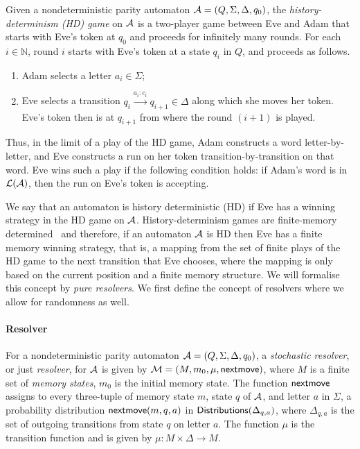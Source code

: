 \begin{definition}\label{defn:hd-game}
Given a nondeterministic parity automaton $\mathcal{A} = (Q,\Sigma, \Delta, q_0)$, the \emph{history-determinism (HD) game} on $\mathcal{A}$ is a two-player game between Eve and Adam that starts with Eve's token at $q_0$ and proceeds for infinitely many rounds. 
For each $i \in \mathbb{N}$, round $i$ starts with Eve's token at a state $q_i$ in $Q$, and proceeds as follows.
\begin{enumerate}
    \item Adam selects a letter $a_i \in \Sigma$;
    \item Eve selects a transition $q_i \xrightarrow{a_i:c_i} q_{i+1} \in \Delta$ along which she moves her token. Eve's token then is at $q_{i+1}$ from where the round $(i+1)$ is played. 
\end{enumerate} 
Thus, in the limit of a play of the HD game, Adam constructs a word letter-by-letter, and Eve constructs a run on her token transition-by-transition on that word. Eve wins such a play if the following condition holds: if Adam's word  is in $\mathcal{L}(\mathcal{A})$, then the run on Eve's token is accepting.
\end{definition}
We say that an automaton is history deterministic (HD) if Eve has a winning strategy in the HD game on $\mathcal{A}$. History-determinism games are finite-memory determined~\cite[Theorem 3.12]{Pra25} and therefore, if an automaton $\mathcal{A}$ is HD then Eve has a finite memory winning strategy, that is, a mapping from the set of finite plays of the HD game to the next transition that Eve chooses, where the mapping is only based on the current position and a finite memory structure. We will formalise this concept by \emph{pure resolvers}. We first define the concept of resolvers where we allow for randomness as well.     

\paragraph*{Resolver}
For a nondeterministic parity automaton $\mathcal{A}=(Q,\Sigma,\Delta,q_0)$, a \emph{stochastic resolver}, or just \emph{resolver}, for $\mathcal{A}$ is given by $\mathcal{M}=(M,m_0,\mu,{\mathsf{nextmove}})$, where $M$ is a finite set of \emph{memory states}, $m_0$ is the initial memory state. The function ${\mathsf{nextmove}}$ assigns to every three-tuple of memory state $m$, state $q$ of $\mathcal{A}$, and letter $a$ in $\Sigma$, a probability distribution ${\mathsf{nextmove}}(m,q,a)$ in ${\mathsf{Distributions}}(\Delta_{q,a})$, where $\Delta_{q,a}$ is the set of outgoing transitions from state $q$ on letter $a$. The function $\mu$ is the transition function and is given by $\mu:M\times \Delta \to M$.

